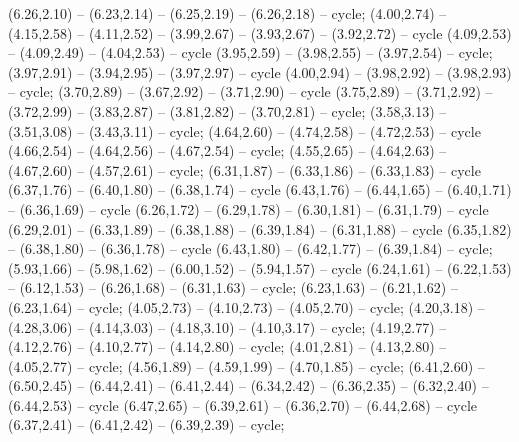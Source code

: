 { (6.26,2.10) -- (6.23,2.14) -- (6.25,2.19) -- (6.26,2.18) -- cycle;
 (4.00,2.74) -- (4.15,2.58) -- (4.11,2.52) -- (3.99,2.67) -- (3.93,2.67) -- (3.92,2.72) -- cycle (4.09,2.53) -- (4.09,2.49) -- (4.04,2.53) -- cycle (3.95,2.59) -- (3.98,2.55) -- (3.97,2.54) -- cycle;
 (3.97,2.91) -- (3.94,2.95) -- (3.97,2.97) -- cycle (4.00,2.94) -- (3.98,2.92) -- (3.98,2.93) -- cycle;
 (3.70,2.89) -- (3.67,2.92) -- (3.71,2.90) -- cycle (3.75,2.89) -- (3.71,2.92) -- (3.72,2.99) -- (3.83,2.87) -- (3.81,2.82) -- (3.70,2.81) -- cycle;
 (3.58,3.13) -- (3.51,3.08) -- (3.43,3.11) -- cycle;
 (4.64,2.60) -- (4.74,2.58) -- (4.72,2.53) -- cycle (4.66,2.54) -- (4.64,2.56) -- (4.67,2.54) -- cycle;
 (4.55,2.65) -- (4.64,2.63) -- (4.67,2.60) -- (4.57,2.61) -- cycle;
 (6.31,1.87) -- (6.33,1.86) -- (6.33,1.83) -- cycle (6.37,1.76) -- (6.40,1.80) -- (6.38,1.74) -- cycle (6.43,1.76) -- (6.44,1.65) -- (6.40,1.71) -- (6.36,1.69) -- cycle (6.26,1.72) -- (6.29,1.78) -- (6.30,1.81) -- (6.31,1.79) -- cycle (6.29,2.01) -- (6.33,1.89) -- (6.38,1.88) -- (6.39,1.84) -- (6.31,1.88) -- cycle (6.35,1.82) -- (6.38,1.80) -- (6.36,1.78) -- cycle (6.43,1.80) -- (6.42,1.77) -- (6.39,1.84) -- cycle;
 (5.93,1.66) -- (5.98,1.62) -- (6.00,1.52) -- (5.94,1.57) -- cycle (6.24,1.61) -- (6.22,1.53) -- (6.12,1.53) -- (6.26,1.68) -- (6.31,1.63) -- cycle;
 (6.23,1.63) -- (6.21,1.62) -- (6.23,1.64) -- cycle;
 (4.05,2.73) -- (4.10,2.73) -- (4.05,2.70) -- cycle;
 (4.20,3.18) -- (4.28,3.06) -- (4.14,3.03) -- (4.18,3.10) -- (4.10,3.17) -- cycle;
 (4.19,2.77) -- (4.12,2.76) -- (4.10,2.77) -- (4.14,2.80) -- cycle;
 (4.01,2.81) -- (4.13,2.80) -- (4.05,2.77) -- cycle;
 (4.56,1.89) -- (4.59,1.99) -- (4.70,1.85) -- cycle;
 (6.41,2.60) -- (6.50,2.45) -- (6.44,2.41) -- (6.41,2.44) -- (6.34,2.42) -- (6.36,2.35) -- (6.32,2.40) -- (6.44,2.53) -- cycle (6.47,2.65) -- (6.39,2.61) -- (6.36,2.70) -- (6.44,2.68) -- cycle (6.37,2.41) -- (6.41,2.42) -- (6.39,2.39) -- cycle;
}
